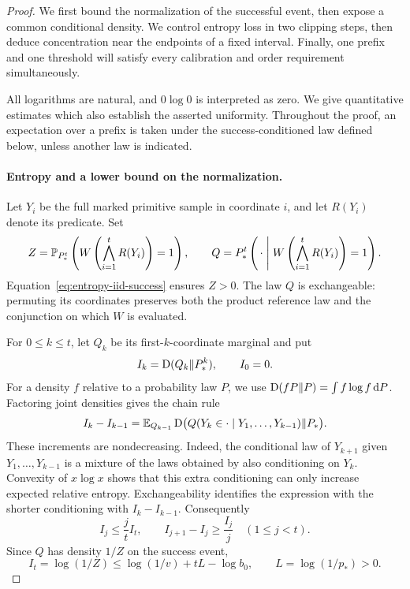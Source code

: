 \begin{proof}
We first bound the normalization of the successful event, then expose a
common conditional density. We control entropy loss in two clipping steps,
then deduce concentration near the endpoints of a fixed interval. Finally,
one prefix and one threshold
will satisfy every calibration and order requirement simultaneously.

All logarithms are natural, and $0\log0$ is interpreted as zero.  We give
quantitative estimates which also establish the asserted uniformity.
Throughout the proof, an expectation over a prefix is taken under the
success-conditioned law defined below, unless another law is indicated.

\paragraph{Entropy and a lower bound on the normalization.}
Let $Y_i$ be the full marked primitive sample in coordinate $i$, and let
$R(Y_i)$ denote its predicate.  Set
\[
 Z=\mathbb P_{P_*^t}\left(W\left(\bigwedge_{i=1}^tR(Y_i)\right)=1\right),
 \qquad
 Q=P_*^t\left(\,\cdot\;\middle|\;
       W\left(\bigwedge_{i=1}^tR(Y_i)\right)=1\right).
\]
Equation~\ref{eq:entropy-iid-success} ensures $Z>0$.  The law $Q$ is
exchangeable: permuting its coordinates preserves both the product
reference law and the conjunction on which $W$ is evaluated.

For $0\le k\le t$, let $Q_k$ be its first-$k$-coordinate marginal and put
\[
 I_k=\operatorname{D}(Q_k\Vert P_*^k),\qquad I_0=0.
\]
For a density $f$ relative to a probability law $P$, we use
$\operatorname{D}(fP\Vert P)=\int f\log f\,\mathrm d P$.  Factoring joint densities gives
the chain rule
\[
 I_k-I_{k-1}
 =\mathbb E_{Q_{k-1}}\operatorname{D}\bigl(Q(Y_k\in\cdot\mid Y_1,\ldots,Y_{k-1})
                         \Vert P_*\bigr).
\]
These increments are nondecreasing.  Indeed, the conditional law of
$Y_{k+1}$ given $Y_1,\ldots,Y_{k-1}$ is a mixture of the laws obtained
by also conditioning on $Y_k$.  Convexity of $x\log x$ shows that this
extra conditioning can only increase expected relative entropy.
Exchangeability identifies the expression with the shorter conditioning
with $I_k-I_{k-1}$.  Consequently
\begin{equation}
 \label{eq:entropy-convex-increments}
 I_j\le \frac jt I_t,
 \qquad I_{j+1}-I_j\ge\frac{I_j}{j}
 \quad(1\le j<t).
\end{equation}
Since $Q$ has density $1/Z$ on the success event,
\begin{equation}
 \label{eq:entropy-total}
 I_t=\log(1/Z)\le \log(1/v)+tL-\log b_0,
 \qquad L=\log(1/p_*)>0.
\end{equation}


\end{proof}
